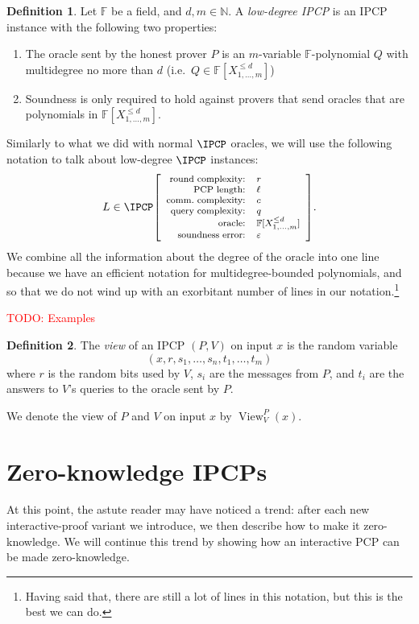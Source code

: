 \documentclass[english,12pt]{reedthesis}
\theoremstyle{plain}
\theoremstyle{definition}
\newtheorem{defn}[defn]{Definition}
\theoremstyle{remark}
\DeclareMathOperator{\View}{View}
\newcommand{\ldipcp}[6]{%
  \ensuremath%
  \mleft[{\footnotesize\begin{array}{r l}
    \text{round complexity:} & #1 \\
    \text{PCP length:} & #2 \\
    \text{comm.\ complexity:} & #3 \\
    \text{query complexity:} & #4 \\
    \text{oracle:} & #5 \\
    \text{soundness error:} & #6
  \end{array}}\mright]%
}
\newcommand{\TODO}[1]{\textcolor{red}{TODO: #1}}
\begin{document}
\begin{defn}\label{def:low-deg-ipcp}
  Let $\mathbb{F}$ be a field, and $d, m \in \mathbb{N}$. A \emph{low-degree IPCP} is an
  IPCP instance with the following two properties:
  \begin{enumerate}
    \item The oracle sent by the honest prover $P$ is an $m$-variable
          $\mathbb{F}$-polynomial $Q$ with multidegree no more than $d$ (i.e.\
          $Q \in \mathbb{F}[X_{1, \ldots, m}^{\le d}]$)
    \item Soundness is only required to hold against provers that send oracles
          that are polynomials in $\mathbb{F}[X_{1, \ldots, m}^{\le d}]$.
  \end{enumerate}
\end{defn}

Similarly to what we did with normal $\IPCP$ oracles, we will use the following
notation to talk about low-degree $\IPCP$ instances:
\begin{equation*}
  L \in \IPCP\ldipcp{r}{\ell}{c}{q}{\mathbb{F}[X_{1, \ldots, m}^{\le d}]}{\varepsilon}.
\end{equation*}
We combine all the information about the degree of the oracle into one line
because we have an efficient notation for multidegree-bounded polynomials, and
so that we do not wind up with an exorbitant number of lines in our
notation.\footnote{Having said that, there are still a lot of lines in this
  notation, but this is the best we can do.}

\TODO{Examples}

\begin{defn}\label{def:ipcp-view}
  The \emph{view} of an IPCP $(P, V)$ on input $x$ is the random variable
  \[
    (x, r, s_{1}, \ldots, s_{n}, t_{1}, \ldots, t_{m})
  \]
  where $r$ is the random bits used by $V$, $s_{i}$ are the messages from $P$,
  and $t_{i}$ are the answers to $V$'s queries to the oracle sent by $P$.
\end{defn}

We denote the view of $P$ and $V$ on input $x$ by $\View_{V}^{P}(x)$.

\section{Zero-knowledge IPCPs}

At this point, the astute reader may have noticed a trend: after each new
interactive-proof variant we introduce, we then describe how to make it
zero-knowledge. We will continue this trend by showing how an interactive PCP
can be made zero-knowledge.
\end{document}
